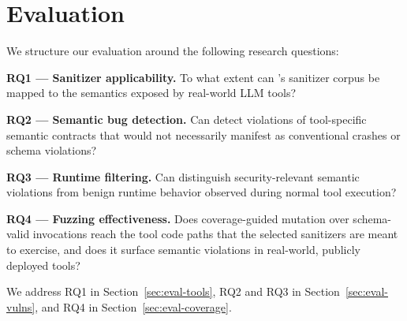 \section{Evaluation}
\label{sec:eval}


We structure our evaluation around the following research questions:

\noindent\textbf{RQ1 --- Sanitizer applicability.} To what extent can \project{}'s sanitizer corpus be mapped to the semantics exposed by real-world LLM tools?

\noindent\textbf{RQ2 --- Semantic bug detection.} Can \project{} detect violations of tool-specific semantic contracts that would not necessarily manifest as conventional crashes or schema violations?

\noindent\textbf{RQ3 --- Runtime filtering.} Can \project{} distinguish security-relevant semantic violations from benign runtime behavior observed during normal tool execution?

\noindent\textbf{RQ4 --- Fuzzing effectiveness.} Does coverage-guided mutation over schema-valid invocations reach the tool code paths that the selected sanitizers are meant to exercise, and does it surface semantic violations in real-world, publicly deployed tools?

We address RQ1 in Section~\ref{sec:eval-tools}, RQ2 and RQ3 in
Section~\ref{sec:eval-vulns}, and RQ4 in Section~\ref{sec:eval-coverage}.




